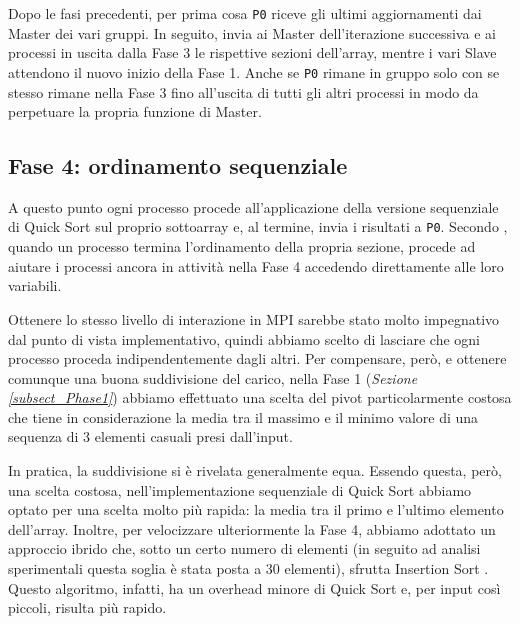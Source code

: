 Dopo le fasi precedenti, per prima cosa  \texttt{P0} riceve gli ultimi aggiornamenti dai Master dei vari gruppi. In seguito, invia ai Master dell'iterazione successiva e ai processi in uscita dalla Fase 3 le rispettive sezioni dell'array, mentre i vari Slave attendono il nuovo inizio della Fase 1.
Anche se  \texttt{P0} rimane in gruppo solo con se stesso rimane nella Fase 3 fino all'uscita di tutti gli altri processi in modo da perpetuare la propria funzione di Master.


\subsection{Fase 4: ordinamento sequenziale} \label{subsect_Phase4}
A questo punto ogni processo procede all'applicazione della versione sequenziale di Quick Sort sul proprio sottoarray e, al termine, invia i risultati a  \texttt{P0}.
Secondo \cite{PaperQuickSort}, quando un processo termina l'ordinamento della propria sezione, procede ad aiutare i processi ancora in attività nella Fase 4 accedendo direttamente alle loro variabili. 

Ottenere lo stesso livello di interazione in MPI sarebbe stato molto impegnativo dal punto di vista implementativo, quindi abbiamo scelto di lasciare che ogni processo proceda indipendentemente dagli altri. Per compensare, però, e ottenere comunque una buona suddivisione del carico, nella Fase 1 (\textit{Sezione \ref{subsect_Phase1}}) abbiamo effettuato una scelta del pivot particolarmente costosa che tiene in considerazione la media tra il massimo e il minimo valore di una sequenza di 3 elementi casuali presi dall'input.

In pratica, la suddivisione si è rivelata generalmente equa. Essendo questa, però, una scelta costosa, nell'implementazione sequenziale di Quick Sort abbiamo optato per una scelta molto più rapida: la media tra il primo e l'ultimo elemento dell'array. Inoltre, per velocizzare ulteriormente la Fase 4, abbiamo adottato un approccio ibrido che, sotto un certo numero di elementi (in seguito ad analisi sperimentali questa soglia è stata posta a 30 elementi),  sfrutta Insertion Sort . Questo algoritmo, infatti, ha un overhead minore di Quick Sort e, per input così piccoli, risulta più rapido.

